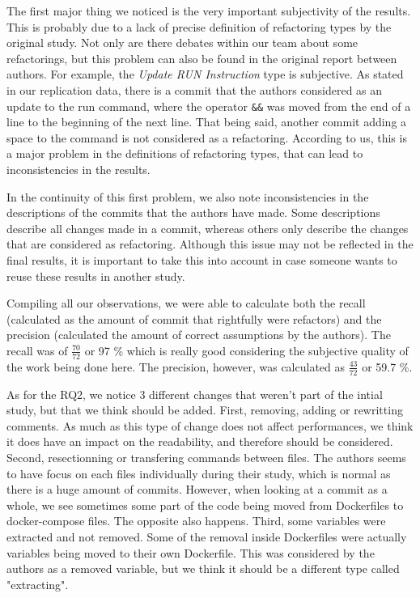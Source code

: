 \documentclass[lettersize,journal]{IEEEtran}
\begin{document}
The first major thing we noticed is the very important subjectivity of the results.
This is probably due to a lack of precise definition of refactoring types by the original study.
Not only are there debates within our team about some refactorings, but this problem can also be found in the original report between authors.
For example, the \textit{Update RUN Instruction} type is subjective.
As stated in our replication data, there is a commit that the authors considered as an update to the run command, where the operator \texttt{\&\&} was moved from the end of a line to the beginning of the next line.
That being said, another commit adding a space to the command is not considered as a refactoring.
According to us, this is a major problem in the definitions of refactoring types, that can lead to inconsistencies in the results.

In the continuity of this first problem, we also note inconsistencies in the descriptions of the commits that the authors have made.
Some descriptions describe all changes made in a commit, whereas others only describe the changes that are considered as refactoring.
Although this issue may not be reflected in the final results, it is important to take this into account in case someone wants to reuse these results in another study.

Compiling all our observations, we were able to calculate both the recall (calculated as the amount of commit that rightfully were refactors) and the precision (calculated the amount of correct assumptions by the authors). 
The recall was of $\frac{70}{72}$ or  97 \% which is really good considering the subjective quality of the work being done here. 
The precision, however, was calculated as $\frac{43}{72}$ or 59.7 \%.

As for the RQ2, we notice 3 different changes that weren't part of the intial study, but that we think should be added.
First, removing, adding or rewritting comments.
As much as this type of change does not affect performances, we think it does have an impact on the readability, and therefore should be considered.
Second, resectionning or transfering commands between files.
The authors seems to have focus on each files individually during their study, which is normal as there is a huge amount of commits.
However, when looking at a commit as a whole, we see sometimes some part of the code being moved from Dockerfiles to docker-compose files. The opposite also happens.
Third, some variables were extracted and not removed.
Some of the removal inside Dockerfiles were actually variables being moved to their own Dockerfile.
This was considered by the authors as a removed variable, but we think it should be a different type called "extracting".
\end{document}
